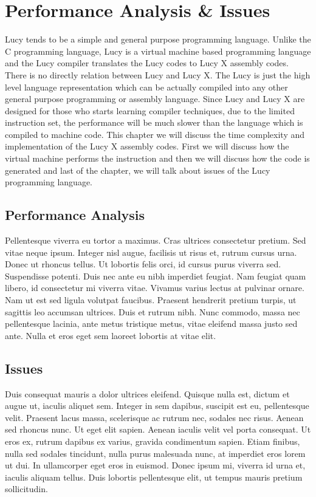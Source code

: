 \chapter{Performance Analysis \& Issues}
Lucy tends to be a simple and general purpose programming language. Unlike the C programming language, Lucy is a virtual machine based programming language and the Lucy compiler translates the Lucy codes to Lucy X assembly codes. There is no directly relation between Lucy and Lucy X. The Lucy is just the high level language representation which can be actually compiled into any other general purpose programming or assembly language. Since Lucy and Lucy X are designed for those who starts learning compiler techniques, due to the limited instruction set, the performance will be much slower than the language which is compiled to machine code. This chapter we will discuss the time complexity and implementation of the Lucy X assembly codes. First we will discuss how the virtual machine performs the instruction and then we will discuss how the code is generated and last of the chapter, we will talk about issues of the Lucy programming language.


\section{Performance Analysis}
Pellentesque viverra eu tortor a maximus. Cras ultrices consectetur pretium. Sed vitae neque ipsum. Integer nisl augue, facilisis ut risus et, rutrum cursus urna. Donec ut rhoncus tellus. Ut lobortis felis orci, id cursus purus viverra sed. Suspendisse potenti. Duis nec ante eu nibh imperdiet feugiat. Nam feugiat quam libero, id consectetur mi viverra vitae. Vivamus varius lectus at pulvinar ornare. Nam ut est sed ligula volutpat faucibus. Praesent hendrerit pretium turpis, ut sagittis leo accumsan ultrices. Duis et rutrum nibh. Nunc commodo, massa nec pellentesque lacinia, ante metus tristique metus, vitae eleifend massa justo sed ante. Nulla et eros eget sem laoreet lobortis at vitae elit.


\section{Issues}
Duis consequat mauris a dolor ultrices eleifend. Quisque nulla est, dictum et augue ut, iaculis aliquet sem. Integer in sem dapibus, suscipit est eu, pellentesque velit. Praesent lacus massa, scelerisque ac rutrum nec, sodales nec risus. Aenean sed rhoncus nunc. Ut eget elit sapien. Aenean iaculis velit vel porta consequat. Ut eros ex, rutrum dapibus ex varius, gravida condimentum sapien. Etiam finibus, nulla sed sodales tincidunt, nulla purus malesuada nunc, at imperdiet eros lorem ut dui. In ullamcorper eget eros in euismod. Donec ipsum mi, viverra id urna et, iaculis aliquam tellus. Duis lobortis pellentesque elit, ut tempus mauris pretium sollicitudin.
